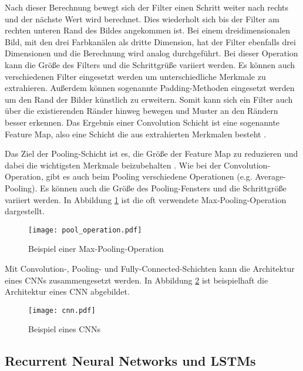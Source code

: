 Nach dieser Berechnung bewegt sich der Filter einen Schritt weiter nach rechts und der nächste Wert wird berechnet. Dies wiederholt sich bis der Filter am rechten unteren Rand des Bildes angekommen ist. Bei einem dreidimensionalen Bild, mit den drei Farbkanälen als dritte Dimension, hat der Filter ebenfalls drei Dimensionen und die Berechnung wird analog durchgeführt. Bei dieser Operation kann die Größe des Filters und die Schrittgrüße variiert werden. Es können auch verschiedenen Filter eingesetzt werden um unterschiedliche Merkmale zu extrahieren. Außerdem können sogenannte Padding-Methoden eingesetzt werden um den Rand der Bilder künstlich zu erweitern. Somit kann sich ein Filter auch über die existierenden Ränder hinweg bewegen und Muster an den Rändern besser erkennen. Das Ergebnis einer Convolution Schicht ist eine sogenannte Feature Map, also eine Schicht die aus extrahierten Merkmalen besteht \cite{lecun1997convolutional}.

Das Ziel der Pooling-Schicht ist es, die Größe der Feature Map zu reduzieren und dabei die wichtigsten Merkmale beizubehalten \cite{scherer2010evaluation}. Wie bei der Convolution-Operation, gibt es auch beim Pooling verschiedene Operationen (e.g. Average-Pooling). Es können auch die Größe des Pooling-Fensters und die Schrittgröße variiert werden. In Abbildung \ref{fig_pool_operation} ist die oft verwendete Max-Pooling-Operation dargestellt.

\begin{figure}[h]
\centering
\texttt{[image: pool\_operation.pdf]}
\caption{Beispiel einer Max-Pooling-Operation}
\label{fig_pool_operation}
\end{figure}

Mit Convolution-, Pooling- und Fully-Connected-Schichten kann die Architektur eines \acp{CNN} zusammengesetzt werden. In Abbildung \ref{fig_cnn} ist beispielhaft die Architektur eines \ac{CNN} abgebildet.


\begin{figure}[h]
\centering
\texttt{[image: cnn.pdf]}
\caption{Beispiel eines \aclp{CNN}}
\label{fig_cnn}
\end{figure}


\subsection{Recurrent Neural Networks und LSTMs}
\label{grundlagen_nn_rnn}

